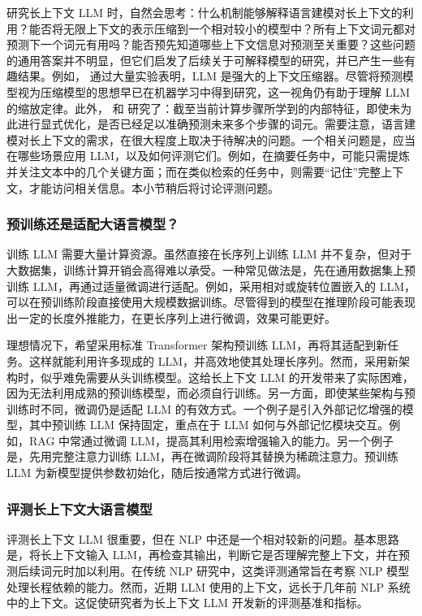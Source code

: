 研究长上下文 LLM 时，自然会思考：什么机制能够解释语言建模对长上下文的利用？能否将无限上下文的表示压缩到一个相对较小的模型中？所有上下文词元都对预测下一个词元有用吗？能否预先知道哪些上下文信息对预测至关重要？这些问题的通用答案并不明显，但它们启发了后续关于可解释模型的研究，并已产生一些有趣结果。例如，\citet{deletang-etal:2024language} 通过大量实验表明，LLM 是强大的上下文压缩器。尽管将预测模型视为压缩模型的思想早已在机器学习中得到研究，这一视角仍有助于理解 LLM 的缩放定律。此外，\citet{pal-etal:2023future} 和 \citet{wu-etal:2024language} 研究了：截至当前计算步骤所学到的内部特征，即使未为此进行显式优化，是否已经足以准确预测未来多个步骤的词元。需要注意，语言建模对长上下文的需求，在很大程度上取决于待解决的问题。一个相关问题是，应当在哪些场景应用 LLM，以及如何评测它们。例如，在摘要任务中，可能只需提炼并关注文本中的几个关键方面；而在类似检索的任务中，则需要“记住”完整上下文，才能访问相关信息。本小节稍后将讨论评测问题。

\subsubsection{预训练还是适配大语言模型？}

训练 LLM 需要大量计算资源。虽然直接在长序列上训练 LLM 并不复杂，但对于大数据集，训练计算开销会高得难以承受。一种常见做法是，先在通用数据集上预训练 LLM，再通过适量微调进行适配。例如，采用相对或旋转位置嵌入的 LLM，可以在预训练阶段直接使用大规模数据训练。尽管得到的模型在推理阶段可能表现出一定的长度外推能力，在更长序列上进行微调，效果可能更好。

理想情况下，希望采用标准 Transformer 架构预训练 LLM，再将其适配到新任务。这样就能利用许多现成的 LLM，并高效地使其处理长序列。然而，采用新架构时，似乎难免需要从头训练模型。这给长上下文 LLM 的开发带来了实际困难，因为无法利用成熟的预训练模型，而必须自行训练。另一方面，即使某些架构与预训练时不同，微调仍是适配 LLM 的有效方式。一个例子是引入外部记忆增强的模型，其中预训练 LLM 保持固定，重点在于 LLM 如何与外部记忆模块交互。例如，RAG 中常通过微调 LLM，提高其利用检索增强输入的能力。另一个例子是，先用完整注意力训练 LLM，再在微调阶段将其替换为稀疏注意力。预训练 LLM 为新模型提供参数初始化，随后按通常方式进行微调。

\subsubsection{评测长上下文大语言模型}

\noindent 评测长上下文 LLM 很重要，但在 NLP 中还是一个相对较新的问题。基本思路是，将长上下文输入 LLM，再检查其输出，判断它是否理解完整上下文，并在预测后续词元时加以利用。在传统 NLP 研究中，这类评测通常旨在考察 NLP 模型处理长程依赖的能力。然而，近期 LLM 使用的上下文，远长于几年前 NLP 系统中的上下文。这促使研究者为长上下文 LLM 开发新的评测基准和指标。

